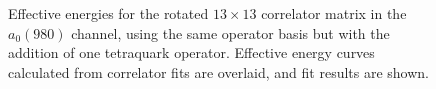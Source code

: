 \begin{figure}
  \caption{Effective energies for the rotated $13\times 13$ correlator matrix in the $a_0(980)$ channel, using the same operator basis but with the addition of one tetraquark operator. Effective energy curves calculated from correlator fits are overlaid, and fit results are shown.}
  \label{fig:a0_with_tq_grid}
\end{figure}

